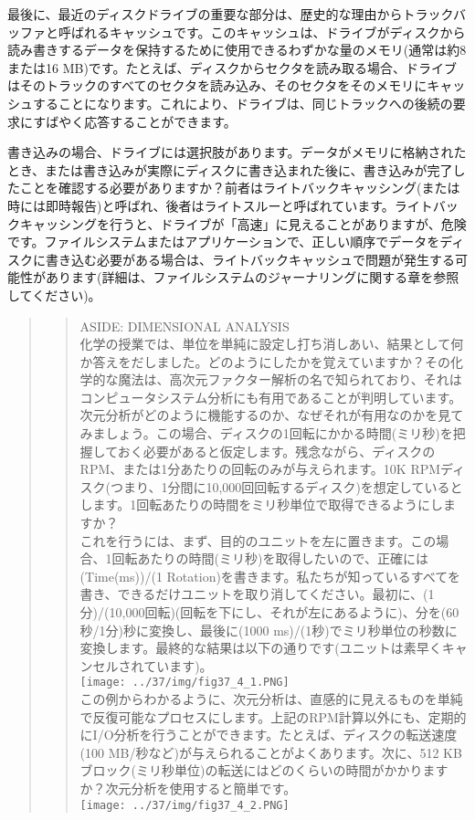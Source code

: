 最後に、最近のディスクドライブの重要な部分は、歴史的な理由からトラックバッファと呼ばれるキャッシュです。このキャッシュは、ドライブがディスクから読み書きするデータを保持するために使用できるわずかな量のメモリ(通常は約8または16
MB)です。たとえば、ディスクからセクタを読み取る場合、ドライブはそのトラックのすべてのセクタを読み込み、そのセクタをそのメモリにキャッシュすることになります。これにより、ドライブは、同じトラックへの後続の要求にすばやく応答することができます。

書き込みの場合、ドライブには選択肢があります。データがメモリに格納されたとき、または書き込みが実際にディスクに書き込まれた後に、書き込みが完了したことを確認する必要がありますか？前者はライトバックキャッシング(または時には即時報告)と呼ばれ、後者はライトスルーと呼ばれています。ライトバックキャッシングを行うと、ドライブが「高速」に見えることがありますが、危険です。ファイルシステムまたはアプリケーションで、正しい順序でデータをディスクに書き込む必要がある場合は、ライトバックキャッシュで問題が発生する可能性があります(詳細は、ファイルシステムのジャーナリングに関する章を参照してください)。

\begin{quote}
\begin{quote}
ASIDE: DIMENSIONAL ANALYSIS\\
化学の授業では、単位を単純に設定し打ち消しあい、結果として何か答えをだしました。どのようにしたかを覚えていますか？その化学的な魔法は、高次元ファクター解析の名で知られており、それはコンピュータシステム分析にも有用であることが判明しています。\\
次元分析がどのように機能するのか、なぜそれが有用なのかを見てみましょう。この場合、ディスクの1回転にかかる時間(ミリ秒)を把握しておく必要があると仮定します。残念ながら、ディスクのRPM、または1分あたりの回転のみが与えられます。10K
RPMディスク(つまり、1分間に10,000回回転するディスク)を想定しているとします。1回転あたりの時間をミリ秒単位で取得できるようにしますか？\\
これを行うには、まず、目的のユニットを左に置きます。この場合、1回転あたりの時間(ミリ秒)を取得したいので、正確には(Time(ms))/(1
Rotation)を書きます。私たちが知っているすべてを書き、できるだけユニットを取り消してください。最初に、(1分)/(10,000回転)(回転を下にし、それが左にあるように)、分を(60秒/1分)秒に変換し、最後に(1000
ms)/(1秒)でミリ秒単位の秒数に変換します。最終的な結果は以下の通りです(ユニットは素早くキャンセルされています)。\\
\texttt{[image: ../37/img/fig37\_4\_1.PNG]}\\
この例からわかるように、次元分析は、直感的に見えるものを単純で反復可能なプロセスにします。上記のRPM計算以外にも、定期的にI/O分析を行うことができます。たとえば、ディスクの転送速度(100
MB/秒など)が与えられることがよくあります。次に、512
KBブロック(ミリ秒単位)の転送にはどのくらいの時間がかかりますか？次元分析を使用すると簡単です。\\
\texttt{[image: ../37/img/fig37\_4\_2.PNG]}
\end{quote}
\end{quote}

